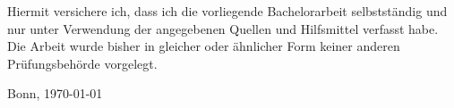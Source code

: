 Hiermit versichere ich, dass ich die vorliegende Bachelorarbeit selbstständig und nur unter Verwendung der angegebenen Quellen und Hilfsmittel verfasst habe. 
Die Arbeit wurde bisher in gleicher oder ähnlicher Form keiner anderen Prüfungsbehörde vorgelegt.

\vspace*{3cm}
\par\noindent%
Bonn, \today \hfill \underline{\hspace*{5.5cm}}
\vspace*{\fill}